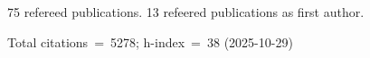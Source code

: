 75 refereed publications. 13 refeered publications as first author.

Total citations~=~5278; h-index~=~38 (2025-10-29)
